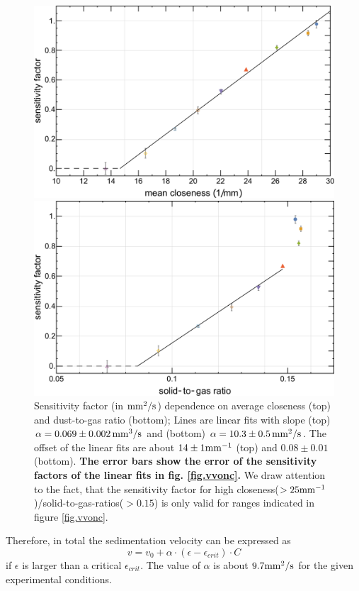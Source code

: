 \begin{figure}[h]
\includegraphics[width=\columnwidth]{sense1.pdf}\par
\includegraphics[width=\columnwidth]{sense2.pdf}
    \caption{\label{fig.sensitive1} Sensitivity factor (in $\rm mm^2/s$) dependence on average closeness (top) and dust-to-gas ratio (bottom); {Lines are linear fits with slope (top) $\alpha = 0.069 \pm 0.002\,  \rm mm^3/s$ and (bottom) $\alpha = 10.3 \pm 0.5\, \rm mm^2/s$. {The offset of the linear fits are about  $14 \pm 1\rm mm^{-1}$ (top) and $0.08 \pm 0.01$ (bottom).} \textbf{The error bars show the error of the sensitivity factors of the linear fits in fig. \ref{fig.vvonc}.}
    {We draw attention to the fact, that the sensitivity factor for high closeness($> 25\rm mm^{-1}$)/solid-to-gas-ratios($>0.15$) is only valid for ranges indicated in figure \ref{fig.vvonc}.}}}
\end{figure}

{Therefore, in total the sedimentation velocity can be expressed as
\begin{equation}
v = v_0 + \alpha \cdot (\epsilon-\epsilon_{crit}) \cdot C   
\end{equation}
if $\epsilon$ is larger than a critical $\epsilon_{crit}$.} {The value of $\alpha$ is about $9.7 \rm mm^2/s$ for the given experimental conditions.}


